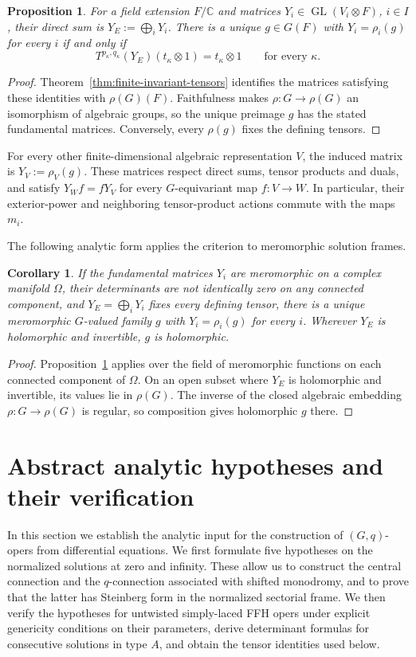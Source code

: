 \documentclass[11pt,leqno]{amsart}
\numberwithin{equation}{section}
\theoremstyle{plain}
\newtheorem{proposition}[theorem]{Proposition}
\newtheorem{corollary}[theorem]{Corollary}
\theoremstyle{definition}
\theoremstyle{plain}
\theoremstyle{definition}
\theoremstyle{remark}
\begin{document}
\begin{proposition}\label{prop:finite-tensor-reconstruction}
For a field extension $F/\mathbb C$ and matrices $Y_i\in\operatorname{GL}(V_i\otimes F)$, $i\in I$, their direct sum is $Y_E:=\bigoplus_iY_i$.  There is a unique $g\in G(F)$ with $Y_i=\rho_i(g)$ for every $i$ if and only if
\[
 T^{p_\kappa,q_\kappa}(Y_E)(t_\kappa\otimes1)=t_\kappa\otimes1
 \qquad\text{for every }\kappa.
\]
\end{proposition}
\begin{proof}
Theorem~\ref{thm:finite-invariant-tensors} identifies the matrices satisfying these identities with $\rho(G)(F)$.  Faithfulness makes $\rho:G\to\rho(G)$ an isomorphism of algebraic groups, so the unique preimage $g$ has the stated fundamental matrices.  Conversely, every $\rho(g)$ fixes the defining tensors.
\end{proof}

For every other finite-dimensional algebraic representation $V$, the induced matrix is $Y_V:=\rho_V(g)$.  These matrices respect direct sums, tensor products and duals, and satisfy $Y_Wf=fY_V$ for every $G$-equivariant map $f:V\to W$.  In particular, their exterior-power and neighboring tensor-product actions commute with the maps $m_i$.

The following analytic form applies the criterion to meromorphic solution frames.
\begin{corollary}\label{cor:finite-tensor-analytic}
If the fundamental matrices $Y_i$ are meromorphic on a complex manifold $\Omega$, their determinants are not identically zero on any connected component, and $Y_E=\bigoplus_iY_i$ fixes every defining tensor, there is a unique meromorphic $G$-valued family $g$ with $Y_i=\rho_i(g)$ for every $i$.  Wherever $Y_E$ is holomorphic and invertible, $g$ is holomorphic.
\end{corollary}
\begin{proof}
Proposition~\ref{prop:finite-tensor-reconstruction} applies over the field of meromorphic functions on each connected component of $\Omega$.  On an open subset where $Y_E$ is holomorphic and invertible, its values lie in $\rho(G)$.  The inverse of the closed algebraic embedding $\rho:G\to\rho(G)$ is regular, so composition gives holomorphic $g$ there.
\end{proof}

\section{Abstract analytic hypotheses and their verification}\label{sec:analytic-input}
In this section we establish the analytic input for the construction of $(G,q)$-opers from differential equations.  We first formulate five hypotheses on the normalized solutions at zero and infinity.  These allow us to construct the central connection and the $q$-connection associated with shifted monodromy, and to prove that the latter has Steinberg form in the normalized sectorial frame.  We then verify the hypotheses for untwisted simply-laced FFH opers under explicit genericity conditions on their parameters, derive determinant formulas for consecutive solutions in type $A$, and obtain the tensor identities used below.
\end{document}

